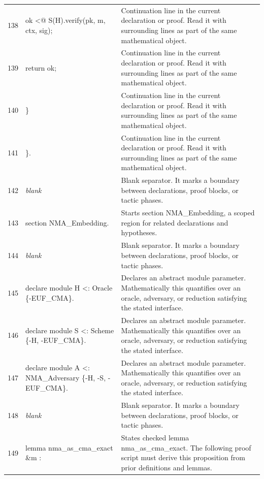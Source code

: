 \documentclass[10pt]{article}
\begin{document}
\begin{longtable}{r L{0.53\textwidth} L{0.37\textwidth}}
138 & {\ttfamily\scriptsize     ok <@ S(H).verify(pk, m, ctx, sig);} & Continuation line in the current declaration or proof.  Read it with surrounding lines as part of the same mathematical object. \\
139 & {\ttfamily\scriptsize     return ok;} & Continuation line in the current declaration or proof.  Read it with surrounding lines as part of the same mathematical object. \\
140 & {\ttfamily\scriptsize   \}} & Continuation line in the current declaration or proof.  Read it with surrounding lines as part of the same mathematical object. \\
141 & {\ttfamily\scriptsize \}.} & Continuation line in the current declaration or proof.  Read it with surrounding lines as part of the same mathematical object. \\
142 & {\ttfamily\scriptsize \emph{blank}} & Blank separator.  It marks a boundary between declarations, proof blocks, or tactic phases. \\
143 & {\ttfamily\scriptsize section NMA\_Embedding.} & Starts section NMA\_Embedding, a scoped region for related declarations and hypotheses. \\
144 & {\ttfamily\scriptsize \emph{blank}} & Blank separator.  It marks a boundary between declarations, proof blocks, or tactic phases. \\
145 & {\ttfamily\scriptsize declare module H <: Oracle \{-EUF\_CMA\}.} & Declares an abstract module parameter.  Mathematically this quantifies over an oracle, adversary, or reduction satisfying the stated interface. \\
146 & {\ttfamily\scriptsize declare module S <: Scheme \{-H, -EUF\_CMA\}.} & Declares an abstract module parameter.  Mathematically this quantifies over an oracle, adversary, or reduction satisfying the stated interface. \\
147 & {\ttfamily\scriptsize declare module A <: NMA\_Adversary \{-H, -S, -EUF\_CMA\}.} & Declares an abstract module parameter.  Mathematically this quantifies over an oracle, adversary, or reduction satisfying the stated interface. \\
148 & {\ttfamily\scriptsize \emph{blank}} & Blank separator.  It marks a boundary between declarations, proof blocks, or tactic phases. \\
149 & {\ttfamily\scriptsize lemma nma\_as\_cma\_exact \&m :} & States checked lemma nma\_as\_cma\_exact.  The following proof script must derive this proposition from prior definitions and lemmas. \\

\end{longtable}
\end{document}
